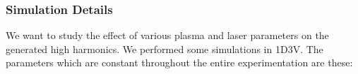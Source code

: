 \documentclass{beamer}
\begin{document}
\begin{frame}
    \frametitle{Simulation Details}
    \small
    We want to study the effect of various plasma and laser parameters on the generated high harmonics. We performed some simulations in 1D3V. The parameters which are constant throughout the entire experimentation are these:



\end{frame}
\end{document}
